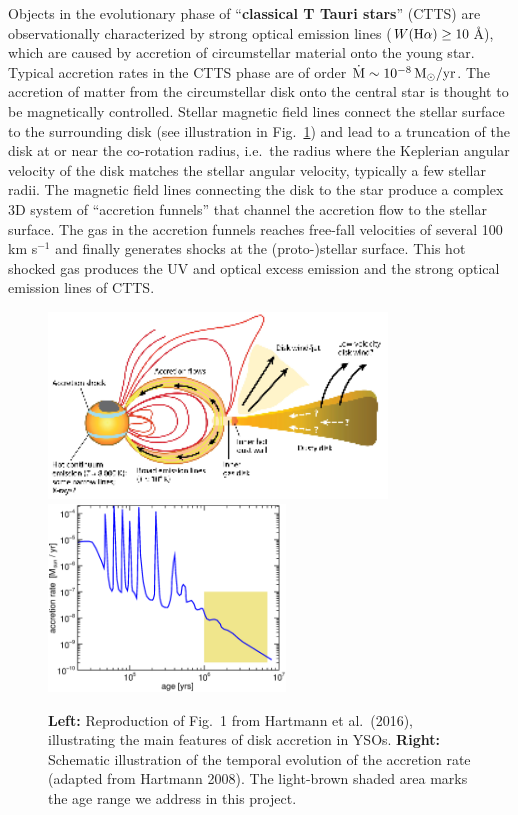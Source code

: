 \documentclass[10pt,fleqn,twoside]{article}
\begin{document}
Objects in the evolutionary phase of ``\textbf{classical T Tauri stars}''
(CTTS) are observationally characterized by strong optical emission lines 
($W({\rm H}\alpha) \ge 10$\,\AA), which are caused by accretion of 
circumstellar material onto the young star.
Typical accretion rates in the CTTS phase are of order
$\dot{\rm M} \sim 10^{-8}\,\rm M_\odot/yr$.
%
The accretion of matter from the circumstellar disk onto the
central star is thought to be magnetically controlled.
Stellar
magnetic field lines connect the stellar surface to
the surrounding disk (see illustration in Fig.~\ref{hartmann.fig})
and lead to a truncation of the
disk at or near the co-rotation radius, i.e.~the radius
where the Keplerian angular velocity of the disk
matches the stellar angular velocity, typically a few stellar radii. 
The magnetic field lines connecting the disk to the star
produce a complex 3D system of ``accretion funnels''
that channel the accretion flow to the stellar surface.
The gas in the accretion funnels reaches free-fall velocities
of several 100 km s$^{-1}$ and finally generates shocks at the
(proto-)stellar surface. 
This hot shocked gas produces the UV and
optical excess emission 
and the strong optical emission lines of CTTS.


\begin{figure} %
\centering
\includegraphics[width=9.0cm]{accretion-hartmann-scetch.eps}\hspace{1mm}
\includegraphics[width=6.3cm,clip=true]{Mdot-hartmann.eps}
\caption{\small \textbf{Left:} Reproduction of Fig.~1 from Hartmann et al.~(2016),
illustrating the main features of disk accretion in YSOs.
\textbf{Right:} Schematic illustration of the temporal evolution of the accretion rate
(adapted from Hartmann 2008). The light-brown shaded area marks the age range
we address in this project.
\label{hartmann.fig}}
\end{figure} %
\end{document}
